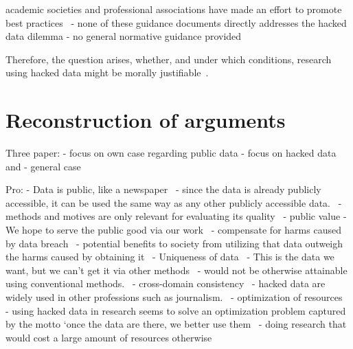 academic societies and professional associations
have made an effort to promote best practices~\parencite[][745]{nature}
- none of these guidance documents directly addresses the hacked data dilemma
- no general normative guidance provided

Therefore, the question arises, whether, and under which conditions, research using hacked data might be morally justifiable~\parencite[][745]{nature}.

\section*{Reconstruction of arguments}

Three paper:
- focus on own case regarding public data
- focus on hacked data and
- general case

Pro:
- Data is public, like a newspaper~\parencite[][5]{patreon}
  - since the data is already publicly accessible, it can be used the same way as any other publicly accessible data.~\parencite[][23]{acm}
  - methods and motives are only relevant for evaluating its quality~\parencite[][23]{acm}
- public value
  - We hope to serve the public good via our work~\parencite[][5]{patreon}
  - compensate for harms caused by data breach~\parencite[][745]{nature}
  - potential benefits to society from utilizing that data outweigh the harms caused by obtaining it~\parencite[][23]{acm}
- Uniqueness of data~\parencite[][745]{nature}
  - This is the data we want, but we can’t get it via other methods~\parencite[][5]{patreon}
  - would not be otherwise attainable using conventional methods.~\parencite[][745]{nature}
- cross-domain consistency~\parencite[][746]{nature}
  - hacked data are widely used in other professions such as journalism.~\parencite[][745]{nature}
- optimization of resources~\parencite[][746]{nature}
  - using hacked data in research seems to solve an optimization problem captured by the motto ‘once the data are there, we better use them~\parencite[][745]{nature}
  - doing research that would cost a large amount of resources otherwise~\parencite[][745]{nature}

